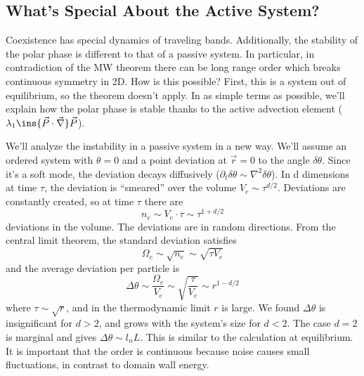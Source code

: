 \subsection{What's Special About the Active System?}
Coexistence has special dynamics of traveling bands. Additionally, the stability of the polar phase is different to that of a passive system. In particular, in contradiction of the MW theorem there can be long range order which breaks continuous symmetry in 2D. How is this possible? First, this is a system out of equilibrium, so the theorem doesn't apply. In as simple terms as possible, we'll explain how the polar phase is stable thanks to the active advection element (\(\lambda_1\ins{\vec P\cdot\vec\nabla}\vec P\)).

We'll analyze the instability in a passive system in a new way. We'll assume an ordered system with \(\theta=0\) and a point deviation at \(\vec r=0\) to the angle \(\delta\theta \). Since it's a soft mode, the deviation decays diffusively (\(\partial_t\delta\theta \sim \nabla^2\delta\theta \)). In d dimensions at time \(\tau \), the deviation is ``smeared'' over the volume \(V_e \sim \tau^{d/2}\). Deviations are constantly created, so at time \(\tau \) there are
\begin{equation}
	n_e \sim V_e\cdot\tau\sim\tau^{1+d/2}
\end{equation}
deviations in the volume. The deviations are in random directions. From the central limit theorem, the standard deviation satisfies
\begin{equation}
	\Omega_e \sim \sqrt{n_e}\sim\sqrt{\tau V_e}
\end{equation}
and the average deviation per particle is
\begin{equation}
	\Delta\theta\sim\frac{\Omega_e}{V_e}\sim\sqrt{\frac{\tau}{V_e}}\sim r^{1-d/2}
\end{equation}
where \(\tau\sim\sqrt{r}\), and in the thermodynamic limit \(r\) is large. We found \(\Delta\theta \) is insignificant for \(d>2\), and grows with the system's size for \(d<2\). The case \(d=2\) is marginal and gives \(\Delta\theta\sim l_n L\). This is similar to the calculation at equilibrium. It is important that the order is continuous because noise causes small fluctuations, in contrast to domain wall energy.